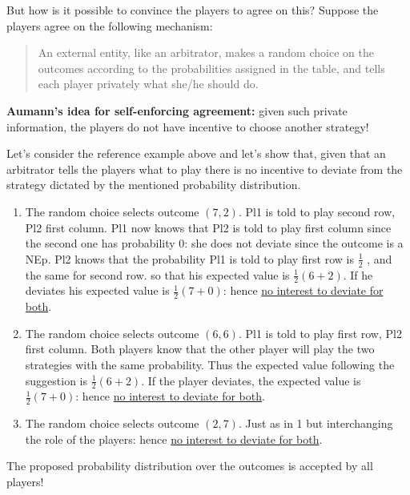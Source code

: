 \documentclass[../main.tex]{subfiles}
\begin{document}
But how is it possible to convince the players to agree on this? Suppose the players agree on the following mechanism:
\begin{quote}
    An external entity, like an arbitrator, makes a random choice on the outcomes
    according to the probabilities assigned in the table, and tells each player privately
    what she/he should do.
\end{quote}

\textbf{Aumann's idea for self-enforcing agreement:} given such private information, the
players do not have incentive to choose another strategy!

\begin{example}
    Let's consider the reference example above and let's show that, given that an arbitrator tells the players what to play there is no incentive to deviate from the strategy dictated by the mentioned probability distribution.
    \begin{enumerate}
        \item The random choice selects outcome $(7,2)$. Pl1 is told to play second row, Pl2 first column. Pl1 now knows that Pl2 is told to play first column since the second one has probability $0$: she does not deviate since the outcome is a \gls{NEp}. Pl2 knows that the probability Pl1 is told to play first row is $\frac{1}{2}$ , and the same for second row. so that his expected value is $\frac{1}{2}(6 + 2)$. If he deviates his expected value is $\frac{1}{2}(7 + 0)$: hence \underline{no interest to deviate for both}.
        \item The random choice selects outcome $(6,6)$. Pl1 is told to play first row, Pl2 first column. Both players know that the other player will play the two strategies with the same probability. Thus the expected value following the suggestion is $\frac{1}{2}(6 + 2)$. If the player deviates, the expected value is $\frac{1}{2}(7 + 0)$: hence \underline{no interest to deviate for both}.
        \item The random choice selects outcome $(2,7)$. Just as in 1 but interchanging the role of the players: hence \underline{no interest to deviate for both}.
    \end{enumerate}
    The proposed probability distribution over the outcomes is accepted by all players!
\end{example}
\end{document}
